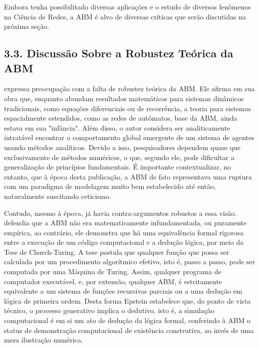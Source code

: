 \documentclass[12pt,oneside,a4paper,brazil,sumario=tradicional]{abntex2}
\begin{document}
Embora tenha possibilitado diversas aplicações e o estudo de diversos fenômenos na Ciência de Redes, a ABM é alvo de diversas críticas que serão discutidas na próxima seção.

\subsection*{3.3. Discussão Sobre a Robustez Teórica da ABM}
 expressa preocupação com a falta de robustez teórica da ABM. Ele afirma em sua obra que, enquanto abundam resultados matemáticos para sistemas dinâmicos tradicionais, como equações diferenciais ou de recorrência, a teoria para sistemas espacialmente estendidos, como as redes de autômatos, base da ABM, ainda estava em sua "infância". Além disso, o autor considera ser analiticamente intratável encontrar o comportamento global emergente de um sistema de agentes usando métodos analíticos. Devido a isso, pesquisadores dependem quase que exclusivamente de métodos numéricos, o que, segundo ele, pode dificultar a generalização de princípios fundamentais. É importante contextualizar, no entanto, que à época desta publicação, a ABM de fato representava uma ruptura com um paradigma de modelagem muito bem estabelecido até então, naturalmente suscitando ceticismo.

Contudo, mesmo à época, já havia contra-argumentos robustos a essa visão.  defendia que a ABM não era matematicamente infundamentada, ou puramente empírica, ao contrário, ele demonstra que há uma equivalência formal rigorosa entre a execução de um código computacional e a dedução lógica, por meio da Tese de Church-Turing. A tese postula que qualquer função que possa ser calculada por um procedimento algorítmico efetivo, isto é, passo a passo, pode ser computada por uma Máquina de Turing. Assim, qualquer programa de computador executável, e, por extensão, qualquer ABM, é estritamente equivalente a um sistema de funções recursivas parciais ou a uma dedução em lógica de primeira ordem. Desta forma Epstein estabelece que, do ponto de vista técnico, o processo generativo implica o dedutivo, isto é, a simulação computacional é em si um ato de dedução da lógica formal, conferindo à ABM o status de demonstração computacional de existência construtiva, ao invés de uma mera ilustração numérica.
\end{document}
